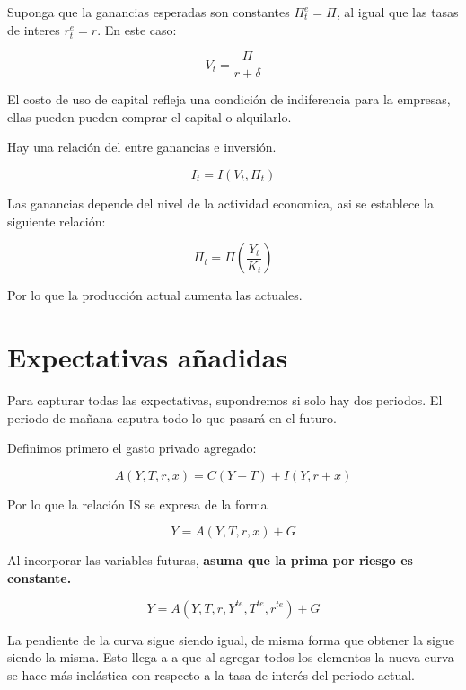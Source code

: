 Suponga que la ganancias esperadas son constantes $\Pi^{e}_{t}= \Pi$, al igual que las tasas de interes $r_{t}^{e}=r$.  En este caso:

\begin{equation}
    V_{t}=\frac{\Pi}{r+\delta}
\end{equation}

El costo de uso de capital refleja una condición de indiferencia para la empresas, ellas pueden pueden comprar el capital o alquilarlo. 

Hay una relación del entre ganancias e inversión. 

\begin{equation}
    I_{t}=I(V_{t}, \Pi_{t})
\end{equation}

Las ganancias depende del nivel de la actividad economica, asi se establece la siguiente relación:

\begin{equation}
    \Pi_{t}=\Pi(\frac{Y_{t}}{K_{t}})
\end{equation}

Por lo que la producción actual aumenta las actuales.

\section{Expectativas añadidas}

Para capturar todas las expectativas, supondremos si solo hay dos periodos. El periodo de mañana caputra todo lo que pasará en el futuro.

Definimos primero el gasto privado agregado:

\begin{equation}
    A(Y,T,r,x)=C(Y-T)+I(Y,r+x)
\end{equation}

Por lo que la relación IS se expresa de la forma

\begin{equation}
    Y= A(Y,T,r,x) +G
\end{equation}

Al incorporar las variables futuras, \textbf{asuma que la prima por riesgo es constante.}

\begin{equation}
        Y= A(Y,T,r,Y^{te},T^{te},r^{te}) +G
\end{equation}

La pendiente de la curva sigue siendo igual, de misma forma que obtener la sigue siendo la misma. Esto llega a a que al agregar todos los elementos la nueva curva se hace más inelástica con respecto a la tasa de interés del periodo actual.

